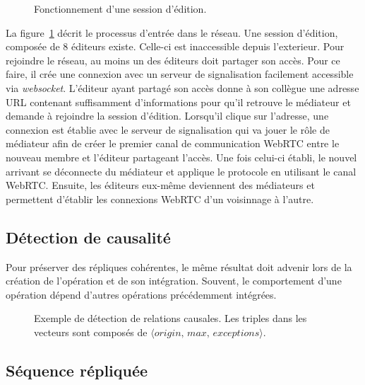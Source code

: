 \begin{figure}
  \begin{center}
    
    \caption{\label{editor:fig:entering}Fonctionnement d'une session d'édition.}
  \end{center}
\end{figure}

La figure~\ref{editor:fig:entering} décrit le processus d'entrée dans le réseau.
Une session d'édition, composée de 8 éditeurs existe. Celle-ci est inaccessible
depuis l'exterieur. Pour rejoindre le réseau, au moins un des éditeurs doit
partager son accès. Pour ce faire, il crée une connexion avec un serveur de
signalisation facilement accessible via \emph{websocket}. L'éditeur ayant
partagé son accès donne à son collègue une adresse URL contenant suffisamment
d'informations pour qu'il retrouve le médiateur et demande à rejoindre la
session d'édition. Lorsqu'il clique sur l'adresse, une connexion est établie
avec le serveur de signalisation qui va jouer le rôle de médiateur afin de créer
le premier canal de communication WebRTC entre le nouveau membre et l'éditeur
partageant l'accès. Une fois celui-ci établi, le nouvel arrivant se déconnecte
du médiateur et applique le protocole \SPRAY en utilisant le canal
WebRTC. Ensuite, les éditeurs eux-même deviennent des médiateurs et permettent
d'établir les connexions WebRTC d'un voisinnage à l'autre.

\subsection{Détection de causalité}

Pour préserver des répliques cohérentes, le même résultat doit advenir lors de
la création de l'opération et de son intégration. Souvent, le comportement d'une
opération dépend d'autres opérations précédemment intégrées.

\begin{figure}
  \begin{center}
    
    \caption{\label{editor:fig:timeline}Exemple de détection de relations
      causales. Les triples dans les vecteurs sont composés de
      $\langle origin,\, max,\, exceptions\rangle$.}
  \end{center}
\end{figure}

\subsection{Séquence répliquée}


